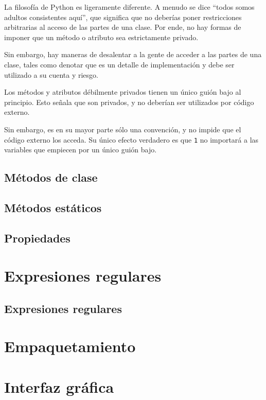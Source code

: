 \documentclass{report}
\newcommand{\doble}[1]{``#1''}
\newcommand{\ttt}[1]{
  \texttt{1}
}
\begin{document}
La filosofía de Python es ligeramente diferente. A menudo se dice \doble{todos somos adultos consistentes aquí}, que significa que no deberías poner restricciones arbitrarias al acceso de las partes de una clase. Por ende, no hay formas de imponer que un método o atributo sea estrictamente privado.\smallskip

Sin embargo, hay maneras de desalentar a la gente de acceder a las partes de una clase, tales como denotar que es un detalle de implementación y debe ser utilizado a su cuenta y riesgo.\smallskip

Los métodos y atributos débilmente privados tienen un único guión bajo al principio. Esto señala que son privados, y no deberían ser utilizados por código externo.\smallskip

Sin embargo, es en su mayor parte sólo una convención, y no impide que el código externo los acceda. Su único efecto verdadero es que \ttt{from nombre\_de\_modulo import *} no importará a las variables que empiecen por un único guión bajo.

\section{Métodos de clase}

\section{Métodos estáticos}

\section{Propiedades}

\clearpage\chapter{Expresiones regulares}

\section{Expresiones regulares}

\clearpage\chapter{Empaquetamiento}

\clearpage\chapter{Interfaz gráfica}
\end{document}

